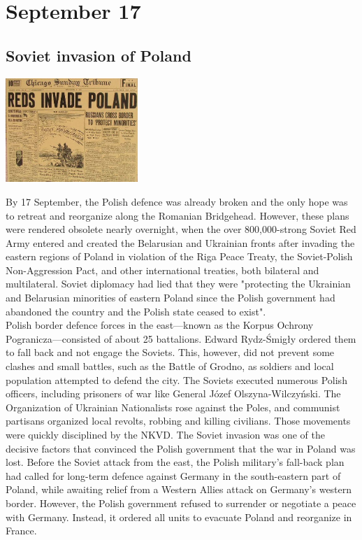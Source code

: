 \documentclass[11pt]{report}
\begin{document}
\section{September 17}
\subsection{Soviet invasion of Poland}
\vspace{2mm}\begin{center}\includegraphics[width=5cm]{./img/ussrInvPol.jpg}\end{center}
By 17 September, the Polish defence was already broken and the only hope was to retreat and reorganize along the Romanian Bridgehead. However, these plans were rendered obsolete nearly overnight, when the over 800,000-strong Soviet Red Army entered and created the Belarusian and Ukrainian fronts after invading the eastern regions of Poland in violation of the Riga Peace Treaty, the Soviet-Polish Non-Aggression Pact, and other international treaties, both bilateral and multilateral. Soviet diplomacy had lied that they were "protecting the Ukrainian and Belarusian minorities of eastern Poland since the Polish government had abandoned the country and the Polish state ceased to exist".\\
\indent Polish border defence forces in the east—known as the Korpus Ochrony Pogranicza—consisted of about 25 battalions. Edward Rydz-Śmigły ordered them to fall back and not engage the Soviets. This, however, did not prevent some clashes and small battles, such as the Battle of Grodno, as soldiers and local population attempted to defend the city. The Soviets executed numerous Polish officers, including prisoners of war like General Józef Olszyna-Wilczyński. The Organization of Ukrainian Nationalists rose against the Poles, and communist partisans organized local revolts, robbing and killing civilians. Those movements were quickly disciplined by the NKVD. The Soviet invasion was one of the decisive factors that convinced the Polish government that the war in Poland was lost. Before the Soviet attack from the east, the Polish military's fall-back plan had called for long-term defence against Germany in the south-eastern part of Poland, while awaiting relief from a Western Allies attack on Germany's western border. However, the Polish government refused to surrender or negotiate a peace with Germany. Instead, it ordered all units to evacuate Poland and reorganize in France.
\end{document}
